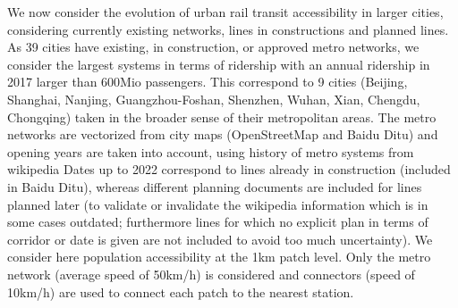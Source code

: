 \documentclass[11pt]{article}
\begin{document}


We now consider the evolution of urban rail transit accessibility in larger cities, considering currently existing networks, lines in constructions and planned lines. As 39 cities have existing, in construction, or approved metro networks, we consider the largest systems in terms of ridership with an annual ridership in 2017 larger than 600Mio passengers. This correspond to 9 cities (Beijing, Shanghai, Nanjing, Guangzhou-Foshan, Shenzhen, Wuhan, Xian, Chengdu, Chongqing) taken in the broader sense of their metropolitan areas. The metro networks are vectorized from city maps (OpenStreetMap and Baidu Ditu) and opening years are taken into account, using history of metro systems from wikipedia Dates up to 2022 correspond to lines already in construction (included in Baidu Ditu), whereas different planning documents are included for lines planned later (to validate or invalidate the wikipedia information which is in some cases outdated; furthermore lines for which no explicit plan in terms of corridor or date is given are not included to avoid too much uncertainty). We consider here population accessibility at the 1km patch level. Only the metro network (average speed of 50km/h) is considered and connectors (speed of 10km/h) are used to connect each patch to the nearest station.


\end{document}
